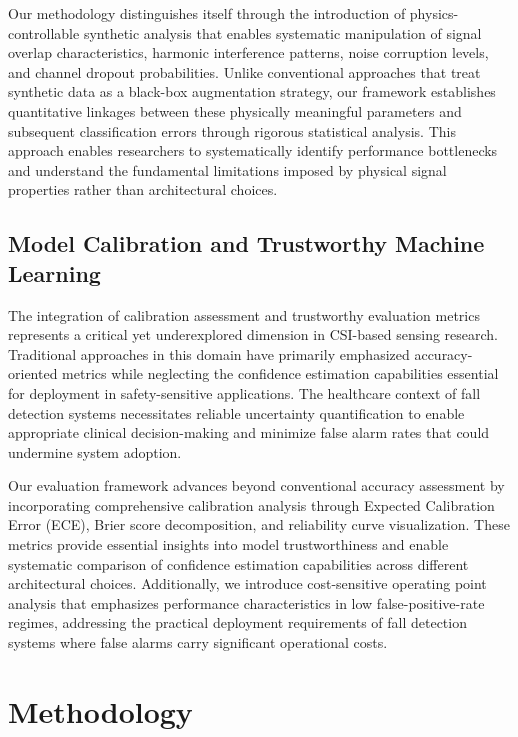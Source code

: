 \documentclass[10pt,conference]{IEEEtran}
\begin{document}
Our methodology distinguishes itself through the introduction of physics-controllable synthetic analysis that enables systematic manipulation of signal overlap characteristics, harmonic interference patterns, noise corruption levels, and channel dropout probabilities. Unlike conventional approaches that treat synthetic data as a black-box augmentation strategy, our framework establishes quantitative linkages between these physically meaningful parameters and subsequent classification errors through rigorous statistical analysis. This approach enables researchers to systematically identify performance bottlenecks and understand the fundamental limitations imposed by physical signal properties rather than architectural choices.

\subsection{Model Calibration and Trustworthy Machine Learning}

The integration of calibration assessment and trustworthy evaluation metrics represents a critical yet underexplored dimension in CSI-based sensing research. Traditional approaches in this domain have primarily emphasized accuracy-oriented metrics while neglecting the confidence estimation capabilities essential for deployment in safety-sensitive applications. The healthcare context of fall detection systems necessitates reliable uncertainty quantification to enable appropriate clinical decision-making and minimize false alarm rates that could undermine system adoption.

Our evaluation framework advances beyond conventional accuracy assessment by incorporating comprehensive calibration analysis through Expected Calibration Error (ECE), Brier score decomposition, and reliability curve visualization. These metrics provide essential insights into model trustworthiness and enable systematic comparison of confidence estimation capabilities across different architectural choices. Additionally, we introduce cost-sensitive operating point analysis that emphasizes performance characteristics in low false-positive-rate regimes, addressing the practical deployment requirements of fall detection systems where false alarms carry significant operational costs.

\section{Methodology}
\end{document}
